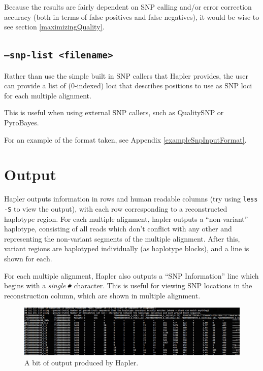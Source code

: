 \documentclass[11pt]{llncs}
\begin{document}
Because the results are fairly dependent on SNP calling and/or error correction accuracy (both in terms of false positives and false negatives), it would
be wise to see section \ref{maximizingQuality}.

\subsection{\texttt{--snp-list <filename>}}

Rather than use the simple built in SNP callers that Hapler provides, the user can provide a list of (0-indexed) loci that describes positions to
use as SNP loci for each multiple alignment. 

This is useful when using external SNP callers, such as QualitySNP or PyroBayes.

For an example of the format taken, see Appendix \ref{exampleSnpInputFormat}.


\newpage

\section{Output}
\label{output}

Hapler outputs information in rows and human readable columns (try using \texttt{less -S} to view the output), with each row corresponding to a 
reconstructed haplotype region. For each multiple alignment, hapler outputs a ``non-variant'' haplotype, consisting of all reads which don't
conflict with any other and representing the non-variant segments of the multiple alignment. After this, variant regions are haplotyped individually
(as haplotype blocks), and a line is shown for each. 

For each multiple alignment, Hapler also outputs a ``SNP Information'' line which begins with a \emph{single} \verb=#= character. This is useful
for viewing SNP locations in the reconstruction column, which are shown in multiple alignment.

\begin{figure}[!h]
\centering
   \includegraphics[width=\textwidth]{graphics/hapler_output}
   \caption{A bit of output produced by Hapler.}
   \label{haplerOutput}
\end{figure}
\end{document}
